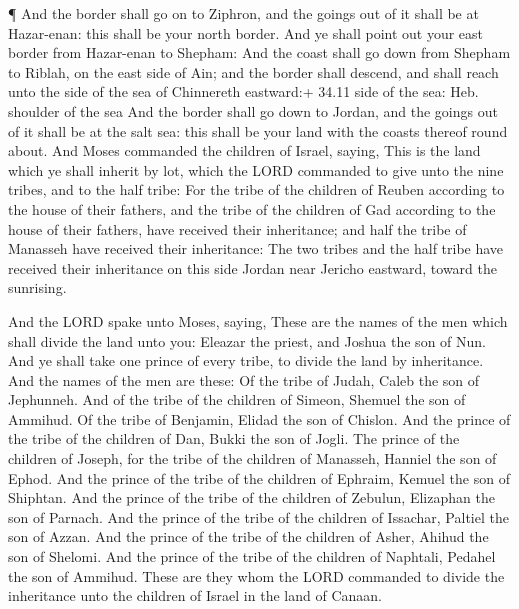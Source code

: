  ¶ And the border shall go on to Ziphron, and the goings out
of it shall be at Hazar-enan: this shall be your north border.
 And ye shall point out your east border from Hazar-enan to
Shepham:  And the coast shall go down from Shepham to
Riblah, on the east side of Ain; and the border shall descend, and shall
reach unto the side of the sea of Chinnereth eastward:+ 34.11 side of
the sea: Heb. shoulder of the sea  And the border shall go
down to Jordan, and the goings out of it shall be at the salt sea: this
shall be your land with the coasts thereof round about. 
And Moses commanded the children of Israel, saying, This is the land
which ye shall inherit by lot, which the LORD commanded to give unto the
nine tribes, and to the half tribe:  For the tribe of the
children of Reuben according to the house of their fathers, and the
tribe of the children of Gad according to the house of their fathers,
have received their inheritance; and half the tribe of Manasseh have
received their inheritance:  The two tribes and the half
tribe have received their inheritance on this side Jordan near Jericho
eastward, toward the sunrising.

 And the LORD spake unto Moses, saying,  These
are the names of the men which shall divide the land unto you: Eleazar
the priest, and Joshua the son of Nun.  And ye shall take
one prince of every tribe, to divide the land by inheritance.
 And the names of the men are these: Of the tribe of Judah,
Caleb the son of Jephunneh.  And of the tribe of the
children of Simeon, Shemuel the son of Ammihud.  Of the
tribe of Benjamin, Elidad the son of Chislon.  And the
prince of the tribe of the children of Dan, Bukki the son of Jogli.
 The prince of the children of Joseph, for the tribe of the
children of Manasseh, Hanniel the son of Ephod.  And the
prince of the tribe of the children of Ephraim, Kemuel the son of
Shiphtan.  And the prince of the tribe of the children of
Zebulun, Elizaphan the son of Parnach.  And the prince of
the tribe of the children of Issachar, Paltiel the son of Azzan.
 And the prince of the tribe of the children of Asher,
Ahihud the son of Shelomi.  And the prince of the tribe of
the children of Naphtali, Pedahel the son of Ammihud. 
These are they whom the LORD commanded to divide the inheritance unto
the children of Israel in the land of Canaan.

